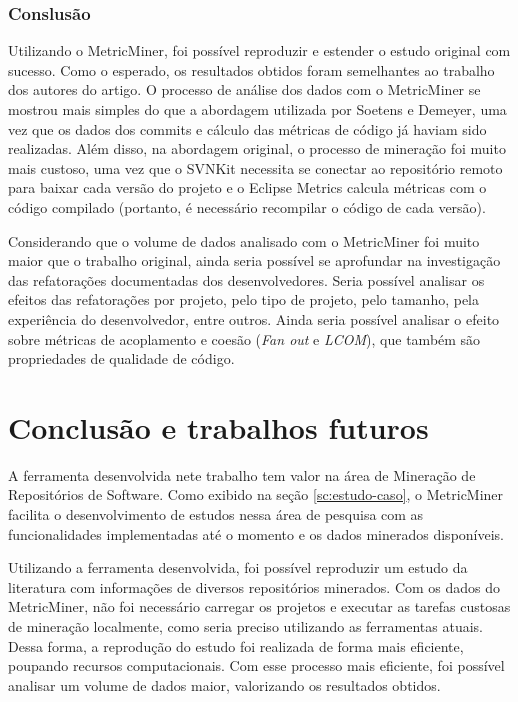 \documentclass[a4paper, 12pt, twoside]{book}
\begin{document}
        \subsection*{Conslusão}
        Utilizando o MetricMiner, foi possível reproduzir e estender o estudo original com sucesso. Como o esperado, os resultados obtidos foram semelhantes ao trabalho dos autores do artigo. O processo de análise dos dados com o MetricMiner se mostrou mais simples do que a abordagem utilizada por Soetens e Demeyer, uma vez que os dados dos commits e cálculo das métricas de código já haviam sido realizadas. Além disso, na abordagem original, o processo de mineração foi muito mais custoso, uma vez que o SVNKit necessita se conectar ao repositório remoto para baixar cada versão do projeto e o Eclipse Metrics calcula métricas com o código compilado (portanto, é necessário recompilar o código de cada versão).

        Considerando que o volume de dados analisado com o MetricMiner foi muito maior que o trabalho original, ainda seria possível se aprofundar na investigação das refatorações documentadas dos desenvolvedores. Seria possível analisar os efeitos das refatorações por projeto, pelo tipo de projeto, pelo tamanho, pela experiência do desenvolvedor, entre outros. Ainda seria possível analisar o efeito sobre métricas de acoplamento e coesão (\textit{Fan out} e \textit{LCOM}), que também são propriedades de qualidade de código.

\chapter{Conclusão e trabalhos futuros} \label{ch:conclusao}
    
        A ferramenta desenvolvida nete trabalho tem valor na área de Mineração de Repositórios de Software. Como exibido na seção \ref{sc:estudo-caso}, o MetricMiner facilita o desenvolvimento de estudos nessa área de pesquisa com as funcionalidades implementadas até o momento e os dados minerados disponíveis.

        Utilizando a ferramenta desenvolvida, foi possível reproduzir um estudo da literatura com informações de diversos repositórios minerados. Com os dados do MetricMiner, não foi necessário carregar os projetos e executar as tarefas custosas de mineração localmente, como seria preciso utilizando as ferramentas atuais. Dessa forma, a reprodução do estudo foi realizada de forma mais eficiente, poupando recursos computacionais. Com esse processo mais eficiente, foi possível analisar um volume de dados maior, valorizando os resultados obtidos.
\end{document}
